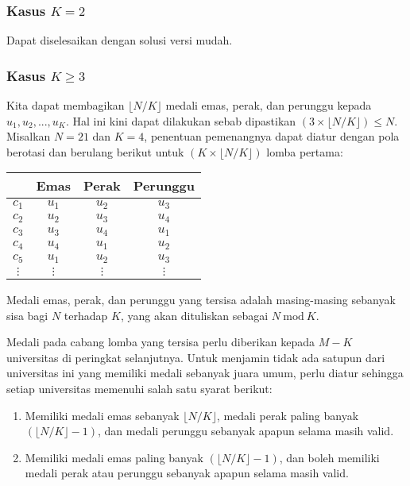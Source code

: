 \documentclass[../main_editorial.tex]{subfiles} %
\newcommand{\Mod}[1]{\ \mathrm{mod}\ #1}
\begin{document}
\subsubsection*{Kasus $K = 2$}
Dapat diselesaikan dengan solusi versi mudah.

\subsubsection*{Kasus $K \ge 3$}
Kita dapat membagikan $\lfloor N / K \rfloor$ medali emas, perak, dan perunggu kepada $u_1, u_2, ..., u_K$. Hal ini kini dapat dilakukan sebab dipastikan $(3 \times \lfloor N / K \rfloor) \le N$. Misalkan $N = 21$ dan $K = 4$, penentuan pemenangnya dapat diatur dengan pola berotasi dan berulang berikut untuk $(K \times \lfloor N / K \rfloor)$ lomba pertama:
\begin{table}[!h]
\centering
\begin{tabular}{|c||c|c|c|}
\hline  & Emas & Perak & Perunggu \\ 
\hline $c_1$ & $u_1$ & $u_2$ & $u_3$ \\ 
\hline $c_2$ & $u_2$ & $u_3$ & $u_4$ \\ 
\hline $c_3$ & $u_3$ & $u_4$ & $u_1$ \\ 
\hline $c_4$ & $u_4$ & $u_1$ & $u_2$ \\ 
\hline $c_5$ & $u_1$ & $u_2$ & $u_3$ \\ 
\hline $\vdots$ & $\vdots$ & $\vdots$ & $\vdots$ \\
\hline 
\end{tabular} 
\end{table}

Medali emas, perak, dan perunggu yang tersisa adalah masing-masing sebanyak sisa bagi $N$ terhadap $K$, yang akan dituliskan sebagai $N \Mod K$.

Medali pada cabang lomba yang tersisa perlu diberikan kepada $M-K$ universitas di peringkat selanjutnya. Untuk menjamin tidak ada satupun dari universitas ini yang memiliki medali sebanyak juara umum, perlu diatur sehingga setiap universitas memenuhi salah satu syarat berikut:

\begin{enumerate}
    \item Memiliki medali emas sebanyak $\lfloor N / K \rfloor$, medali perak paling banyak $(\lfloor N / K \rfloor - 1)$, dan medali perunggu sebanyak apapun selama masih valid.
    \item Memiliki medali emas paling banyak $(\lfloor N / K \rfloor - 1)$, dan boleh memiliki medali perak atau perunggu sebanyak apapun selama masih valid.
\end{enumerate}
\end{document}
